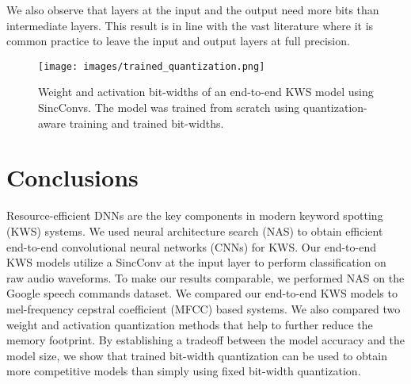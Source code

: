 \documentclass[a4paper]{article}
\begin{document}
We also observe that layers at the input and the output need more bits than intermediate layers. This result is in line with the vast literature where it is common practice to leave the input and output layers at full precision.

\begin{figure}[t]
	\centerline{\texttt{[image: images/trained\_quantization.png]}}
	\caption{Weight and activation bit-widths of an end-to-end KWS model using SincConvs. The model was trained from scratch using quantization-aware training and trained bit-widths.}
	\label{fig:trained_quantization}
\end{figure}

\section{Conclusions}
\label{sec:conclusions}
Resource-efficient DNNs are the key components in modern keyword spotting (KWS) systems. We used neural architecture search (NAS) to obtain efficient end-to-end convolutional neural networks (CNNs) for KWS. Our end-to-end KWS models utilize a SincConv at the input layer to perform classification on raw audio waveforms. To make our results comparable, we performed NAS on the Google speech commands dataset. We compared our end-to-end KWS models to mel-frequency cepstral coefficient (MFCC) based systems. We also compared two weight and activation quantization methods that help to further reduce the memory footprint. By establishing a tradeoff between the model accuracy and the model size, we show that trained bit-width quantization can be used to obtain more competitive models than simply using fixed bit-width quantization. 

\pagebreak



\end{document}
